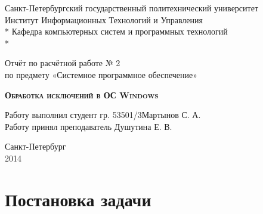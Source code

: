 \documentclass[a4paper, 12pt]{report}		%
\begin{document}
\begin{titlepage}
\thispagestyle{empty}

\begin{center}
Санкт-Петербургский государственный политехнический университет \\
Институт Информационных Технологий и Управления \\*
Кафедра компьютерных систем и программных технологий \\*
\hrulefill
\end{center}

\vspace{18em}

\begin{center}
\Large Отчёт по расчётной работе № 2 \\ по предмету «Системное программное обеспечение» \\
\end{center}

\vspace{1em}

\begin{center}
\textsc{\textbf{Обработка исключений в ОС Windows}}
\end{center}

\vspace{16em}

\begin{flushleft}
Работу выполнил студент гр. 53501/3\hrulefill Мартынов С. А. \\
\vspace{1.5em}
Работу принял преподаватель \hrulefill Душутина Е. В. \\
\end{flushleft}

\vspace{\fill}

\begin{center}
Санкт-Петербург \\
2014
\end{center}

\end{titlepage}
\setcounter{page}{2}
\tableofcontents

\chapter*{Постановка задачи}
\end{document}
